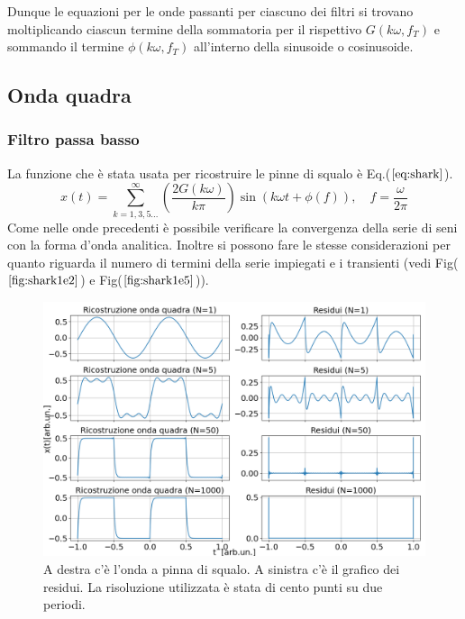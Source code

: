 \documentclass{article}
\begin{document}
Dunque le equazioni per le onde passanti per ciascuno dei filtri si trovano
moltiplicando ciascun termine della sommatoria per il rispettivo 
$G \left( k\omega,f_T\right)$ e sommando il termine $\phi \left( k\omega,f_T\right)$ 
all'interno della sinusoide o cosinusoide.
      

    
    \subsection{Onda quadra}
        \subsubsection{Filtro passa basso}
            \label{sez:int_quadra}
            La funzione che è stata usata per ricostruire le pinne di squalo è Eq.($\ref{eq:shark}$).
                \begin{equation}
                    x(t) = \sum_{k=1,3,5...}^{\infty} \left(\frac{2G(k \omega)}{k\pi}\right)\sin\left(k \omega t+\phi(f) \right),\quad
                    f = \frac{\omega}{2\pi}
                    \label{eq:shark}
                \end{equation}
            Come nelle onde precedenti è possibile verificare la convergenza della serie di 
            seni con la forma d'onda analitica.
            Inoltre si possono fare le stesse considerazioni per quanto riguarda 
            il numero di termini della serie impiegati e i transienti
            (vedi Fig($\ref{fig:shark1e2}$) e Fig($\ref{fig:shark1e5}$)).
                    \begin{figure}[H]
                        \centering
                        \includegraphics[width=1\textwidth]{fousharkfins1e2.png} %
                        \caption{A destra c'è l'onda a pinna di squalo.
                        A sinistra c'è il grafico dei residui.
                        La risoluzione utilizzata è stata di cento punti su due periodi.}
                        \label{fig:shark1e2}
                    \end{figure}
\end{document}
